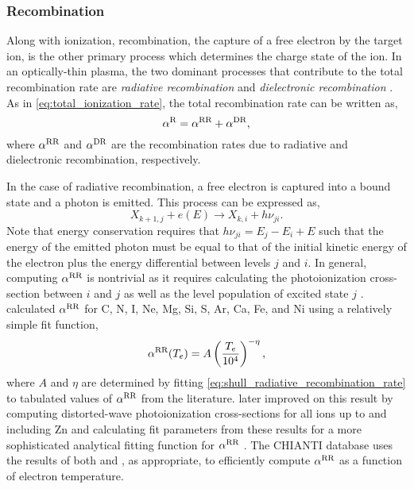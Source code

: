 \subsubsection{Recombination}

Along with ionization, recombination, the capture of a free electron by the target ion, is the other primary process which determines the charge state of the ion. In an optically-thin plasma, the two dominant processes that contribute to the total recombination rate are \textit{radiative recombination} and \textit{dielectronic recombination} \citep{bradshaw_collisional_2013}. As in \autoref{eq:total_ionization_rate}, the total recombination rate can be written as,
\begin{equation}\label{eq:total_recombination_rate}
    \alpha^\textup{R} = \alpha^\textup{RR} + \alpha^\textup{DR},
\end{equation}
where $\alpha^\textup{RR}$ and $\alpha^\textup{DR}$ are the recombination rates due to radiative and dielectronic recombination, respectively.

In the case of radiative recombination, a free electron is captured into a bound state and a photon is emitted. This process can be expressed as,
\begin{equation}\label{eq:radiative_recombination}
    X_{k+1,j} + e(E) \to X_{k,i} + h\nu_{ji}.
\end{equation}
Note that energy conservation requires that $h\nu_{ji}=E_j - E_i + E$ such that the energy of the emitted photon must be equal to that of the initial kinetic energy of the electron plus the energy differential between levels $j$ and $i$. In general, computing $\alpha^\textup{RR}$ is nontrivial as it requires calculating the photoionization cross-section between $i$ and $j$ as well as the level population of excited state $j$ \citep[see Equation 4.47 of][]{phillips_ultraviolet_2008}. \citet{shull_ionization_1982} calculated $\alpha^\textup{RR}$ for C, N, I, Ne, Mg, Si, S, Ar, Ca, Fe, and Ni using a relatively simple fit function,
\begin{equation}\label{eq:shull_radiative_recombination_rate}
    \alpha^\textup{RR}(T_e) = A\left(\frac{T_e}{10^4}\right)^{-\eta},
\end{equation}
where $A$ and $\eta$ are determined by fitting \autoref{eq:shull_radiative_recombination_rate} to tabulated values of $\alpha^\textup{RR}$ from the literature. \citet{badnell_radiative_2006} later improved on this result by computing distorted-wave photoionization cross-sections for all ions up to and including Zn and calculating fit parameters from these results for a more sophisticated analytical fitting function for $\alpha^\textup{RR}$ \citep[see Equation 4 of][]{verner_atomic_1996}. The CHIANTI database uses the results of both \citet{shull_ionization_1982} and \citet{badnell_radiative_2006}, as appropriate, to efficiently compute $\alpha^\textup{RR}$ as a function of electron temperature.

